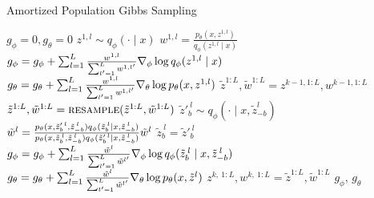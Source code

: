 \documentclass[anonymous=false, %
               format=acmsmall, %
               review=true, %
               screen=true, %
               nonacm=true]{acmart}
\theoremstyle{definition}
\begin{document}
\begin{algorithm}[!tb]
  \caption{Amortized Population Gibbs Sampling}
  \label{alg:amortized-gibbs}
\begin{algorithmic}[1]
\small
  \State $g_\phi = 0, g_\theta = 0$\label{line:init-grad}
  \label{line:rws-loop}
      \State $z^{1,l} \sim q_\phi(\cdot \mid x)$\label{line:rws-propose}
      \State $w^{1,l} = \frac{p_\theta(x, z^{1,l})}{q_\phi(z^{1,l} \mid x)}$\label{line:rws-weight}
  \EndFor
  \State $g_\phi = g_\phi + \sum_{l = 1}^L \frac{w^{1,l}}{\sum_{l' = 1}^L w^{1,l'}} \nabla_\phi \log q_\phi(z^{1,l} \mid x)$\label{line:rws-grad-phi}
  \State $g_\theta = g_\theta + \sum_{l = 1}^L \frac{w^{1,l}}{\sum_{l' = 1}^L w^{1,l'}} \nabla_\theta \log p_\theta(x, z^{1,l})$\label{line:rws-grad-theta}
  \label{line:sweep-loop}
    \State $\tilde{z}^{1:L}, \tilde{w}^{1:L} = z^{k-1,1:L}, w^{k-1,1:L}$ \label{line:apg-sweep-begin}
    \label{line:block-loop}
      \State $\tilde{z}^{1:L}, \tilde{w}^{1:L}=\textsc{resample}(\tilde{z}^{1:L}, \tilde{w}^{1:L})$\label{line:resample} 
        \label{line:apg-sample-loop}
          \State $\tilde{z}'^{\:l}_b \sim q_\phi(\cdot \mid x, \tilde{z}_{-b}^l)$\label{line:apg-propose}
          \State \label{line:apg-weight} $\tilde{w}^l = \frac{p_\theta(x, \tilde{z}'^{\:l}_{b}, \tilde{z}^{\:l}_{-b}) q_\phi(\tilde{z}^{\:l}_b \mid x, \tilde{z}^{\:l}_{-b})}{p_\theta(x, \tilde{z}^{\:l}_b, \tilde{z}^{\:l}_{-b}) q_\phi(\tilde{z}'^{\:l}_b \mid x, \tilde{z}^{\:l}_{-b})}\tilde{w}^l$ 
          \State \label{line:apg-reassign}$\tilde{z}^{\:l}_b = \tilde{z}'^{\:l}_b$ 
      \EndFor
      \State $g_\phi=g_\phi+ \sum_{l = 1}^L\frac{\tilde{w}^l}{\sum_{l'= 1}^L \tilde{w}^{l'}} \nabla_\phi\log q_\phi(\tilde{z}^{\:l}_b \mid x, \tilde{z}^{\:l}_{-b})$\label{line:apg-grad-phi}
      \State $g_\theta = g_\theta + \sum_{l = 1}^L \frac{\tilde{w}^l}{\sum_{l' = 1}^L \tilde{w}^{l'}} \nabla_\theta \log p_\theta(x, \tilde{z}^l)$ \label{line:apg-grad-theta}
     \EndFor
     \State $z^{k,\:1:L}, w^{k,\:1:L} = \tilde{z}^{1:L}, \tilde{w}^{1:L}$\label{line:apg-sweep-end}
     \vspace{0.5em}
  \EndFor
  \Return $g_\phi$, $g_\theta$
\end{algorithmic}
\end{algorithm}
\end{document}
